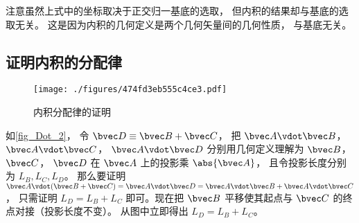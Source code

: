 注意虽然上式中的坐标取决于正交归一基底的选取， 但内积的结果却与基底的选取无关。 这是因为内积的几何定义是两个几何矢量间的几何性质， 与基底无关。

\subsection{证明内积的分配律}
\begin{figure}[ht]
\centering
\texttt{[image: ./figures/474fd3eb555c4ce3.pdf]}
\caption{内积分配律的证明} \label{fig_Dot_2}
\end{figure}

如\autoref{fig_Dot_2}， 令 $\bvec D \equiv \bvec B + \bvec C$， 把 $\bvec A \vdot \bvec B$，  $\bvec A \vdot \bvec C$，  $\bvec A \vdot \bvec D$ 分别用几何定义理解为 $\bvec B$，  $\bvec C$，  $\bvec D$ 在 $\bvec A$ 上的投影乘 $\abs{\bvec A}$， 且令投影长度分别为 $L_B, L_C, L_D$。 那么要证明 $\bvec A \vdot (\bvec B + \bvec C) = \bvec A \vdot \bvec D = \bvec A \vdot \bvec B + \bvec A \vdot \bvec C$， 只需证明 $L_D = L_B + L_C$ 即可。现在把 $\bvec B$ 平移使其起点与 $\bvec C$ 的终点对接（投影长度不变）。 从图中立即得出 $L_D = L_B + L_C$。  
